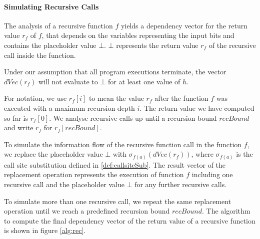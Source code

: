 \paragraph{Simulating Recursive Calls}
The analysis of a recursive function $f$ yields a dependency vector for the return value $r_f$ of $f$, that depends on the variables representing the input bits and contains the placeholder value $\bot$. $\bot$ represents the return value $r_f$ of the recursive call inside the function.

Under our assumption that all program executions terminate, the vector $dVec(r_f)$ will not evaluate to $\bot$ for at least one value of $h$.


For notation, we use $r_f[i]$ to mean the value $r_f$ after the function $f$ was executed with a maximum recursion depth $i$. The return value we have computed so far is $r_f[0]$. We analyse recursive calls up until a recursion bound $recBound$ and write $r_f$ for $r_f[recBound]$.

To simulate the information flow of the recursive function call in the function $f$, we replace the placeholder value $\bot$ with $\sigma_{f(a)}(dVec(r_f))$, where $\sigma_{f(a)}$ is the call site substitution defined in \ref{def:callsiteSub}. The result vector of the replacement operation represents the execution of function $f$ including one recursive call and the placeholder value $\bot$ for any further recursive calls.

To simulate more than one recursive call, we repeat the same replacement operation until we reach a predefined recursion bound $recBound$. The algorithm to compute the final dependency vector of the return value of a recursive function is shown in figure \ref{alg:rec}.

